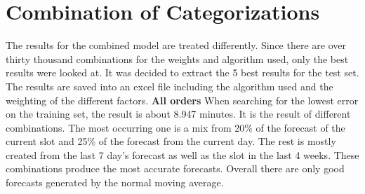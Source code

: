 \section{Combination of Categorizations}\label{section:Combination of Categorizations}
The results for the combined model are treated differently. Since there are over thirty thousand combinations for the weights and algorithm used, only the best results were looked at. It was decided to extract the 5 best results for the test set. The results are saved into an excel file including the algorithm used and the weighting of the different factors.
\newline\newline\textbf{All orders}\newline
When searching for the lowest error on the training set, the result is about 8.947 minutes. It is the result of different combinations. The most occurring one is a mix from 20\% of the forecast of the current slot and 25\% of the forecast from the current day. The rest is mostly created from the last 7 day’s forecast as well as the slot in the last 4 weeks. These combinations produce the most accurate forecasts. Overall there are only good forecasts generated by the normal moving average.
